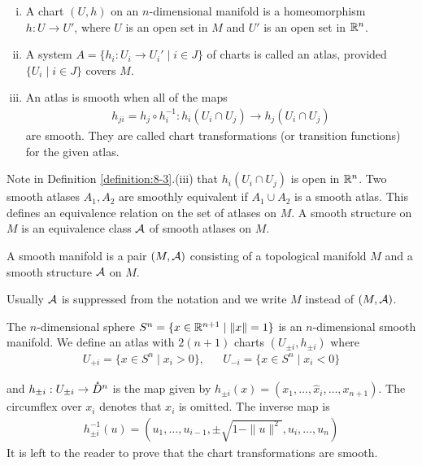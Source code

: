\begin{definition}\label{definition:8-3} 
  \begin{enumerate}[(i)]
    \item A chart $(U, h)$ on an $n$-dimensional manifold is a homeomorphism 
      $h:U\to U'$, where $U$ is an open set in $M$ and $U'$ is an open set in ${\mathbb{R}}^n$.
    \item A system $A = \{h_i: U_i\to U_i'\mid i\in J\}$ of charts is called an atlas, provided 
      $\{U_i \mid i\in J\}$ covers $M$.
    \item An atlas is smooth when all of the maps 
      \begin{align*}
        h_{ji} = h_j\circ h_i^{-1}:h_i(U_i\cap U_j) \to h_j(U_i\cap U_j)
      \end{align*}
      are smooth. They are called chart transformations (or transition functions) for the given atlas.
  \end{enumerate}
\end{definition}

Note in Definition \ref{definition:8-3}.(iii) that $h_i(U_i\cap U_j)$ is open in ${\mathbb{R}}^n$.
Two smooth atlases $A_1, A_2$ are smoothly equivalent if $A_1\cup A_2$ is a smooth atlas.
This defines an equivalence relation on the set of atlases on $M$. A smooth structure
on $M$ is an equivalence class $\mathcal{A}$ of smooth atlases on $M$.

\begin{definition}\label{definition:8-4}
  A smooth manifold is a pair $(M, \mathcal{A})$ consisting of a topological
manifold $M$ and a smooth structure $\mathcal{A}$ on $M$.
\end{definition}

Usually $\mathcal{A}$ is suppressed from the notation and we write $M$ instead of $(M, \mathcal{A})$. 

\begin{example}\label{example:8-5}
  The $n$-dimensional sphere $S^n = \{x\in{\ensuremath{\mathbb{R}}}^{n+1}\mid \|x\|=1\}$ is an $n$-dimensional smooth 
  manifold. We define an atlas with $2(n+1)$ charts $(U_{\pm i}, h_{\pm i})$ where 
  \begin{align*}
    U_{+i} = \{x\in S^n\mid x_i>0\},
    && U_{-i} = \{x\in S^n\mid x_i<0\}
  \end{align*}

  and $h_{\pm i}:U_{\pm i}\to \mathring{D}^n$ is the map given by $h_{\pm i}(x) = (x_1, \ldots, \hat{x}_i, \ldots, x_{n+1})$. 
  The circumflex over $x_i$ denotes that $x_i$ is omitted. The inverse map is 
  \begin{align*}
    h_{\pm i}^{-1}(u) = \left(u_1, \ldots, u_{i-1}, \pm\sqrt{1-\|u\|^2}, u_i, \ldots, u_n\right)
  \end{align*}
  It is left to the reader to prove that the chart transformations are smooth.
\end{example}

